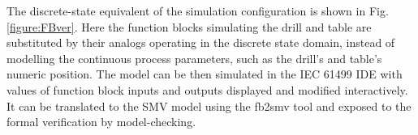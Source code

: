 \begin{bibunit}






The discrete-state equivalent of the simulation configuration is shown in Fig. \ref{figure:FBver}. Here the function blocks simulating the drill and table are substituted by their analogs operating in the discrete state domain, instead of modelling the continuous process parameters, such as the drill's and table's numeric position.
The model can be then simulated in the IEC 61499 IDE with values of function block inputs and outputs displayed and modified interactively. It can be translated to the SMV model using the fb2smv tool and exposed to the formal verification by model-checking. 






\end{bibunit}
